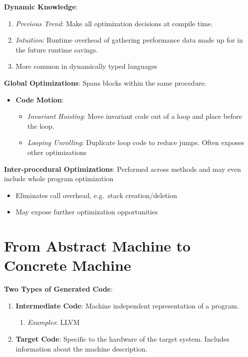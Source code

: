 \documentclass[10pt,twocolumn]{report}
\begin{document}
\textbf{Dynamic Knowledge}:
\begin{enumerate}
  \item \emph{Previous Trend}: Make all optimization decisions at compile time.
  \item \emph{Intuition}: Runtime overhead of gathering performance data made up for in the future runtime savings.
  \item More common in dynamically typed languages
\end{enumerate}

\textbf{Global Optimizations}: Spans blocks within the same procedure.
\begin{itemize}
  \item  \textbf{Code Motion}:
    \begin{itemize}
      \item \textit{Invariant Hoisting}: Move invariant code out of a loop and place before the loop.
      \item \textit{Looping Unrolling}: Duplicate loop code to reduce jumps.  Often exposes other optimizations
    \end{itemize}
\end{itemize}

\textbf{Inter-procedural Optimizations}: Performed across methods and may even include whole program optimization
\begin{itemize}
  \begin{itemize}
    \item Eliminates call overhead, e.g.\ stack creation/deletion
    \item May expose further optimization opportunities
  \end{itemize}
\end{itemize}

\section{From Abstract Machine to Concrete Machine}

\textbf{Two Types of Generated Code}:
\begin{enumerate}
  \item \textbf{Intermediate Code}: Machine independent representation of a program.
    \begin{enumerate}
      \item \emph{Examples}: LLVM
    \end{enumerate}
  \item \textbf{Target Code}: Specific to the hardware of the target system. Includes information about the machine description.
\end{enumerate}
\end{document}
